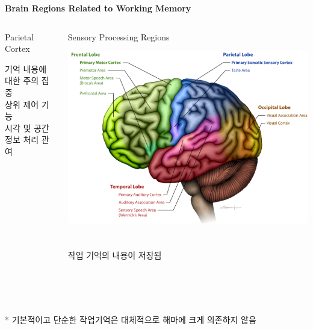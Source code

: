 \documentclass{beamer}
\begin{document}
\begin{frame}{\textbf{Brain Regions Related to Working Memory}}
\begin{columns}
\begin{column}{0.31\textwidth}
\begin{block}{Parietal Cortex}
\begin{minipage}[t][5cm][c]{\textwidth}
          기억 내용에 대한 주의 집중\\
          상위 제어 기능\\
          시각 및 공간 정보 처리 관여
        \end{minipage}
      \end{block}
    \end{column}
    \hfill
    \begin{column}{0.31\textwidth}
      \begin{block}{Sensory Processing Regions}
        \begin{minipage}[t][5cm][c]{\textwidth}
          \centering
          \includegraphics[width=\textwidth]{image/working_memory_b3}\\~\\~\\
          작업 기억의 내용이 저장됨
        \end{minipage}
      \end{block}
    \end{column}
  \end{columns}\\~\\~\\
  \large ** 기본적이고 단순한 작업기억은 대체적으로 해마에 크게 의존하지 않음
\end{frame}
\end{document}
